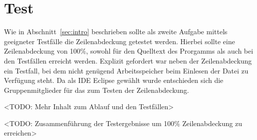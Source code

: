 \documentclass[a4paper,titlepage,12pt]{scrartcl}
\begin{document}
\section{Test}
\label{sec:test}
Wie in Abschnitt~\ref{sec:intro} beschrieben sollte als zweite Aufgabe mittels geeigneter Testfälle die Zeilenabdeckung getestet werden.
Hierbei sollte eine Zeilenabdeckung von 100\%, sowohl für den Quelltext des Prorgamms als auch bei den Testfällen erreicht werden.
Explizit gefordert war neben der Zeilenabdeckung ein Testfall, bei dem nicht genügend Arbeitsspeicher beim Einlesen der Datei zu Verfügung steht.
Da als IDE Eclipse gewählt wurde entschieden sich die Gruppenmitglieder für das \citep{www:ECLEMMA} zum Testen der Zeilenabdeckung.

<TODO: Mehr Inhalt zum Ablauf und den Testfällen>


<TODO: Zusammenführung der Testergebnisse um 100\% Zeilenabdeckung zu erreichen>


\clearpage
\appendix



\end{document}
